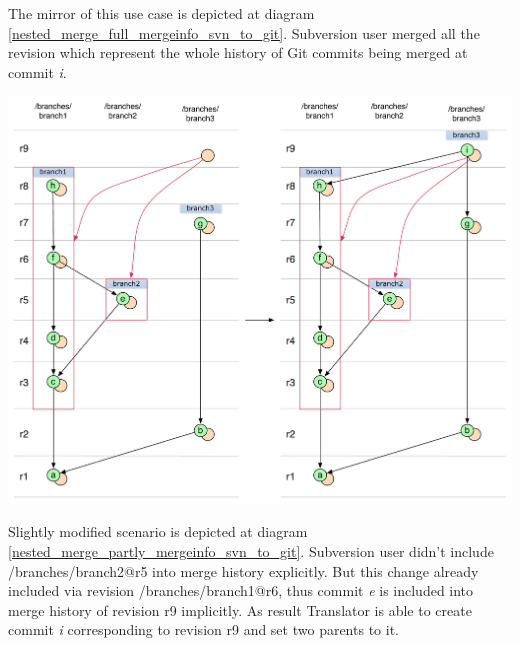 The mirror of this use case is depicted at diagram \ref{nested_merge_full_mergeinfo_svn_to_git}. Subversion user merged all the revision which represent the whole history of Git commits being merged at commit \emph{i}.

\begin{center}
\includegraphics[width=\textwidth]{img/diagrams/nested_merge_full_mergeinfo_svn_to_git.pdf}%
\label{nested_merge_full_mergeinfo_svn_to_git}%
\end{center}

Slightly modified scenario is depicted at diagram \ref{nested_merge_partly_mergeinfo_svn_to_git}. Subversion user didn't include /branches/branch2@r5 into merge history explicitly. But this change already included via revision /branches/branch1@r6, thus commit \emph{e} is included into merge history of revision r9 implicitly. As result Translator is able to create commit \emph{i} corresponding to revision r9 and set two parents to it.

